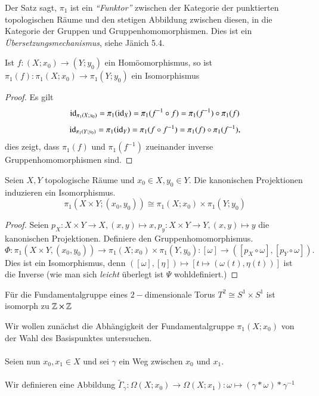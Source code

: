 \documentclass[a4paper,10pt]{scrartcl}
\newcommand{\homo}{\cong}
\begin{document}
\begin{note*}
 Der Satz sagt, $\pi_1$ ist ein \emph{"`Funktor"'} zwischen der Kategorie der punktierten topologischen Räume und den stetigen Abbildung zwischen diesen, in die Kategorie der Gruppen und Gruppenhomomorphismen. Dies ist ein \emph{Übersetzungsmechanismus}, siehe Jänich 5.4.
\end{note*}
\begin{kor}
 Ist $f:(X; x_0)\to (Y; y_0)$ ein Homöomorphismus, so ist $\pi_1(f):\pi_1(X;x_0) \to \pi_1(Y;y_0)$ ein Isomorphismus
\end{kor}
\begin{proof}
 Es gilt 
\[
\operatorname{id}_{\pi_1(X; x_0)}= \pi_1(\operatorname{id}_X)=\pi_1(f^{-1}\circ f)=\pi_1(f^{-1})\circ \pi_1(f)
\]
\[
 \operatorname{id}_{\pi_1(Y;y_0)}=\pi_1(\operatorname{id}_Y)=\pi_1(f\circ f^{-1})=\pi_1(f) \circ \pi_1(f^{-1}),
\]
dies zeigt, dass $\pi_1(f)$ und $\pi_1(f^{-1})$ zueinander inverse Gruppenhomomorphismen sind.
\end{proof}
\begin{st}
 Seien $X,Y$ topologische Räume und $x_0\in X, y_0\in Y$. Die kanonischen Projektionen induzieren ein Isomorphismus.
\[
 \pi_1(X\times Y; (x_0, y_0)) \homo \pi_1(X;x_0) \times \pi_1(Y; y_0)
\]
\end{st}
\begin{proof}
 Seien $p_X: X\times Y \to X, (x,y) \mapsto x, p_y: X\times Y \to Y, (x,y) \mapsto y$ die kanonischen Projektionen. Definiere den Gruppenhomomorphismus.
\[
 \Phi: \pi_1(X\times Y, (x_0, y_0)) \to \pi_1(X;x_0)\times \pi_1(Y,y_0): [\omega] \to ([p_X\circ \omega], [p_Y \circ \omega]).
\]
Dies ist ein Isomorphismus, denn $([\omega],[\eta])\mapsto [t\mapsto (\omega(t), \eta(t))]$ ist die Inverse (wie man sich \emph{leicht} überlegt ist $\Psi$ wohldefiniert.)
\end{proof}
\begin{kor}
 Für die Fundamentalgruppe eines $2-$dimensionale Torus $T^2 \homo S^1 \times S^1$ ist isomorph zu $\mathbb{Z}\times \mathbb{Z}$


\end{kor}

Wir wollen zunächst die Abhängigkeit der Fundamentalgruppe $\pi_1(X;x_0)$ von der Wahl des Basispunktes untersuchen.\\
\fixme[fig65]\\
Seien nun $x_0,x_1 \in X$ und sei $\gamma$ ein Weg zwischen $x_0$ und $x_1$. \\
\fixme[fig66]\\
Wir definieren eine Abbildung $\tilde \Gamma_\gamma: \Omega(X;x_0)\to \Omega(X;x_1): \omega\mapsto (\gamma*\omega)*\gamma^{-1}$
\end{document}
